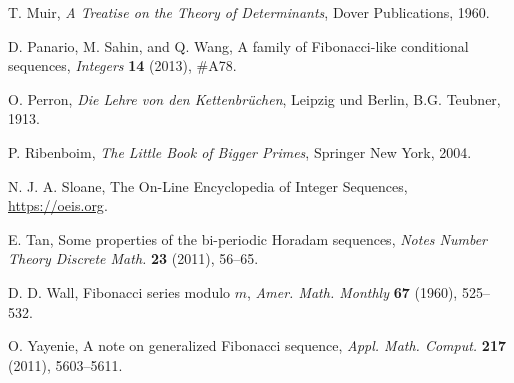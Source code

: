 \documentclass[12pt]{article}
\theoremstyle{plain}
\theoremstyle{definition}
\theoremstyle{remark}
\begin{document}
\begin{thebibliography}{}
	 T. Muir, \textit{A Treatise on the Theory of Determinants}, Dover Publications, 1960.
	
	 D. Panario, M. Sahin, and Q. Wang, A family of Fibonacci-like conditional sequences, \textit{Integers} \textbf{14} (2013), \#A78.	
	
	 O. Perron, \textit{Die Lehre von den Kettenbr\"{u}chen}, Leipzig und Berlin, B.G. Teubner, 1913.
	
	 P. Ribenboim, \textit{The Little Book of Bigger Primes}, Springer New York, 2004.
	
	 N. J. A. Sloane, The On-Line Encyclopedia of Integer Sequences, \url{https://oeis.org}.		
	
	 E. Tan, Some properties of the bi-periodic	Horadam sequences, \textit{Notes Number Theory Discrete Math.} \textbf{23} (2011), 56--65.
	
	 D. D. Wall, Fibonacci series modulo $ m $, \textit{Amer. Math. Monthly} \textbf{67} (1960), 525--532.
	
	 O. Yayenie, A note on generalized Fibonacci sequence, \textit{Appl. Math. Comput.} \textbf{217} (2011), 5603--5611.
\end{thebibliography}
\end{document}
